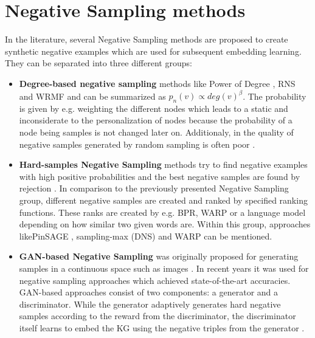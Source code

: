\section{Negative Sampling methods} 
In the literature, several Negative Sampling methods are proposed to create synthetic negative examples which are used for subsequent embedding learning.
They can be separated into three different groups:
\begin{itemize}
    \item 
    \textbf{Degree-based negative sampling} methods like Power of Degree \cite{MikolovSCCD13}, \ac{RNS}\cite{Dupre2018Word2vec} and \ac{WRMF} \cite{Hu2008Collaborative} and can be summarized as $p_n(v) \propto deg(v)^\beta$.
    The probability is given by e.g. weighting the different nodes which leads to a 
    static and inconsiderate to the personalization of nodes \cite{MCNS} because the probability of a node being samples is not changed later on.
    Additionaly, in the quality of negative samples generated by random sampling is  often poor \cite{cai2017kbgan}.
    
    \item 
    \textbf{Hard-samples Negative Sampling} methods try to find negative examples with high positive probabilities and the best negative samples are found by rejection \cite{MCNS}. 
    In comparison to the previously presented Negative Sampling group, 
    different negative samples are created and ranked by specified ranking functions.
    These ranks are created by e.g. \ac{BPR}, \ac{WARP} or a language model depending on how similar two given words are. 
    Within this group, approaches like\ac{PinSAGE} \cite{PinSAGE}, sampling-max (\ac{DNS}) \cite{DNS} and \ac{WARP} \cite{WARP} can be mentioned.
    
    \item 
    \textbf{\ac{GAN}-based Negative Sampling} was originally proposed for generating samples in a continuous space such as images \cite{cai2017kbgan}.
    In recent years it was used for negative sampling approaches which achieved state-of-the-art accuracies. 
    \ac{GAN}-based approaches consist of two components:
    a generator and a discriminator. 
    While the generator adaptively generates hard negative samples according to the reward from the discriminator, the discriminator itself learns to embed the \ac{KG} using the negative triples from the generator \cite{IGAN}.
    
\end{itemize}


